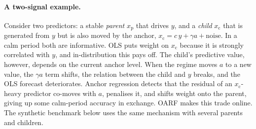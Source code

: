 \documentclass[11pt]{article}
\theoremstyle{plain}
\theoremstyle{remark}
\newcommand{\OARF}{\textsc{OARF}}
\begin{document}
\paragraph{A two-signal example.} Consider two predictors: a stable
\emph{parent} $x_{\mathrm p}$ that drives $y$, and a \emph{child} $x_{\mathrm c}$
that is generated from $y$ but is also moved by the anchor, $x_{\mathrm c}=c\,y+
\gamma a+\text{noise}$. In a calm period both are informative. OLS puts weight on
$x_{\mathrm c}$ because it is strongly correlated with $y$, and in-distribution this
pays off. The child's predictive value, however, depends on the current anchor level.
When the regime moves $a$ to a new value, the $\gamma a$ term shifts, the relation
between the child and $y$ breaks, and the OLS forecast deteriorates. Anchor regression
detects that the residual of an $x_{\mathrm c}$-heavy predictor co-moves with $a$,
penalises it, and shifts weight onto the parent, giving up some calm-period accuracy
in exchange. \OARF{} makes this trade online. The synthetic benchmark below uses the
same mechanism with several parents and children.
\end{document}
